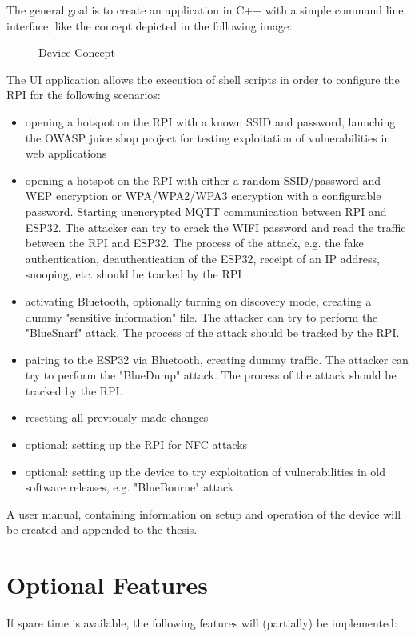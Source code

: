 \documentclass{article}
\begin{document}
The general goal is to create an application in C++ with a simple command line interface, like the concept depicted in the following image:

\vfill

\begin{figure}[H]
    \centering
    \caption{Device Concept}
    \label{fig:image1}
\end{figure}

The UI application allows the execution of shell scripts in order to configure the RPI for the following scenarios:

\begin{itemize}
	\item opening a hotspot on the RPI with a known SSID and password, launching the OWASP juice shop project for testing exploitation of vulnerabilities in web applications 
	\item opening a hotspot on the RPI with either a random SSID/password and WEP encryption or WPA/WPA2/WPA3 encryption with a configurable password. 
    Starting unencrypted MQTT communication between RPI and ESP32. 
    The attacker can try to crack the WIFI password and read the traffic between the RPI and ESP32. 
    The process of the attack, e.g. the fake authentication, deauthentication of the ESP32, receipt of an IP address, snooping, etc. should be tracked by the RPI 
    \item activating Bluetooth, optionally turning on discovery mode, creating a dummy "sensitive information" file. The attacker can try to perform the "BlueSnarf" attack. 
    The process of the attack should be tracked by the RPI.
	\item pairing to the ESP32 via Bluetooth, creating dummy traffic. The attacker can try to perform the "BlueDump" attack.
    The process of the attack should be tracked by the RPI.
	\item resetting all previously made changes
	\item optional: setting up the RPI for NFC attacks
	\item optional: setting up the device to try exploitation of vulnerabilities in old software releases, e.g. "BlueBourne" attack 
\end{itemize}

A user manual, containing information on setup and operation of the device will be created and appended to the thesis.


\section{Optional Features}
    If spare time is available, the following features will (partially) be implemented:
\end{document}

